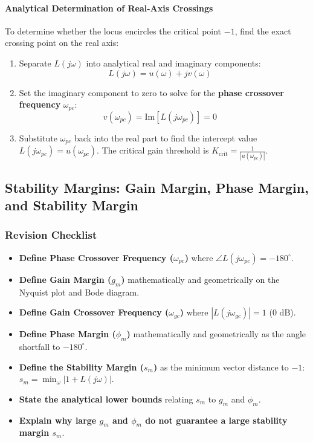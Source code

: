 \documentclass[12pt,onecolumn,twoside ]{article}
\begin{document}
	\paragraph{Analytical Determination of Real-Axis Crossings}
	To determine whether the locus encircles the critical point $-1$, find the exact crossing point on the real axis:
	\begin{enumerate}
		\item
		Separate $L(j\omega)$ into analytical real and imaginary components: \[
		L(j\omega) = u(\omega) + j v(\omega) \quad
		\]
		\item
		Set the imaginary component to zero to solve for the \textbf{phase crossover frequency} $\omega_{pc}$: \[
		v(\omega_{pc}) = \text{Im}[L(j\omega_{pc})] = 0 \quad
		\]
		\item
		Substitute $\omega_{pc}$ back into the real part to find the intercept value $L(j\omega_{pc}) = u(\omega_{pc})$. The critical gain threshold is $K_{\text{crit}} = \frac{1}{|u(\omega_{pc})|}$.
	\end{enumerate}
	
	\subsection{Stability Margins: Gain Margin, Phase Margin, and Stability Margin}
	\subsubsection{Revision Checklist}
	\begin{itemize}
		\item[$\square$]
		\textbf{Define Phase Crossover Frequency ($\omega_{pc}$)} where $\angle L(j\omega_{pc}) = -180^\circ$.
		\item[$\square$]
		\textbf{Define Gain Margin ($g_m$)} mathematically and geometrically on the Nyquist plot and Bode diagram.
		\item[$\square$]
		\textbf{Define Gain Crossover Frequency ($\omega_{gc}$)} where $|L(j\omega_{gc})| = 1$ ($0\text{ dB}$).
		\item[$\square$]
		\textbf{Define Phase Margin ($\phi_m$)} mathematically and geometrically as the angle shortfall to $-180^\circ$.
		\item[$\square$]
		\textbf{Define the Stability Margin ($s_m$)} as the minimum vector distance to $-1$: $s_m = \min_\omega |1 + L(j\omega)|$.
		\item[$\square$]
		\textbf{State the analytical lower bounds} relating $s_m$ to $g_m$ and $\phi_m$.
		\item[$\square$]
		\textbf{Explain why large $g_m$ and $\phi_m$ do not guarantee a large stability margin $s_m$}.
	\end{itemize}
	
\end{document}

